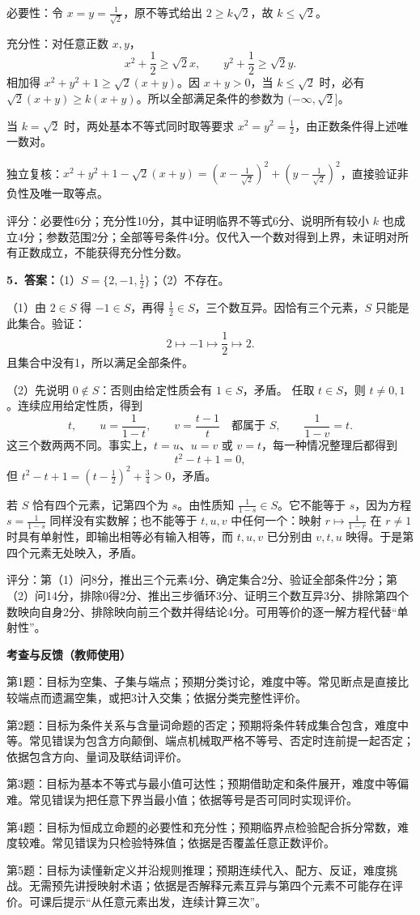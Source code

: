 \documentclass[UTF8,a4paper,11pt]{ctexart}
\begin{document}
必要性：令 $x=y=\frac1{\sqrt2}$，原不等式给出 $2\ge k\sqrt2$，故 $k\le\sqrt2$。

充分性：对任意正数 $x,y$，
\[x^2+\frac12\ge\sqrt2x,\qquad y^2+\frac12\ge\sqrt2y.\]
相加得 $x^2+y^2+1\ge\sqrt2(x+y)$。因 $x+y>0$，当 $k\le\sqrt2$ 时，必有 $\sqrt2(x+y)\ge k(x+y)$。所以全部满足条件的参数为 $(-\infty,\sqrt2]$。

当 $k=\sqrt2$ 时，两处基本不等式同时取等要求 $x^2=y^2=\frac12$，由正数条件得上述唯一数对。

独立复核：$x^2+y^2+1-\sqrt2(x+y)=(x-\frac1{\sqrt2})^2+(y-\frac1{\sqrt2})^2$，直接验证非负性及唯一取等点。

评分：必要性6分；充分性10分，其中证明临界不等式6分、说明所有较小 $k$ 也成立4分；参数范围2分；全部等号条件4分。仅代入一个数对得到上界，未证明对所有正数成立，不能获得充分性分数。

\textbf{5．答案：}\quad（1）$S=\{2,-1,\frac12\}$；（2）不存在。

（1）由 $2\in S$ 得 $-1\in S$，再得 $\frac12\in S$，三个数互异。因恰有三个元素，$S$ 只能是此集合。验证：
\[2\longmapsto-1\longmapsto\frac12\longmapsto2.\]
且集合中没有1，所以满足全部条件。

（2）先说明 $0\notin S$：否则由给定性质会有 $1\in S$，矛盾。
任取 $t\in S$，则 $t\ne0,1$。连续应用给定性质，得到
\[t,\qquad u=\frac1{1-t},\qquad v=\frac{t-1}{t}\quad\text{都属于 }S,\qquad \frac1{1-v}=t.\]
这三个数两两不同。事实上，$t=u$、$u=v$ 或 $v=t$，每一种情况整理后都得到
\[t^2-t+1=0,\]
但 $t^2-t+1=(t-\frac12)^2+\frac34>0$，矛盾。

若 $S$ 恰有四个元素，记第四个为 $s$。由性质知 $\frac1{1-s}\in S$。它不能等于 $s$，因为方程 $s=\frac1{1-s}$ 同样没有实数解；也不能等于 $t,u,v$ 中任何一个：映射 $r\mapsto\frac1{1-r}$ 在 $r\ne1$ 时具有单射性，即输出相等必有输入相等，而 $t,u,v$ 已分别由 $v,t,u$ 映得。于是第四个元素无处映入，矛盾。

评分：第（1）问8分，推出三个元素4分、确定集合2分、验证全部条件2分；第（2）问14分，排除0得2分、推出三步循环3分、证明三个数互异3分、排除第四个数映向自身2分、排除映向前三个数并得结论4分。可用等价的逐一解方程代替“单射性”。

\newpage
\textbf{考查与反馈（教师使用）}

第1题：目标为空集、子集与端点；预期分类讨论，难度中等。常见断点是直接比较端点而遗漏空集，或把3计入交集；依据分类完整性评价。

第2题：目标为条件关系与含量词命题的否定；预期将条件转成集合包含，难度中等。常见错误为包含方向颠倒、端点机械取严格不等号、否定时连前提一起否定；依据包含方向、量词及联结词评价。

第3题：目标为基本不等式与最小值可达性；预期借助定和条件展开，难度中等偏难。常见错误为把任意下界当最小值；依据等号是否可同时实现评价。

第4题：目标为恒成立命题的必要性和充分性；预期临界点检验配合拆分常数，难度较难。常见错误为只检验特殊值；依据是否覆盖任意正数评价。

第5题：目标为读懂新定义并沿规则推理；预期连续代入、配方、反证，难度挑战。无需预先讲授映射术语；依据是否解释元素互异与第四个元素不可能存在评价。可课后提示“从任意元素出发，连续计算三次”。
\end{document}
